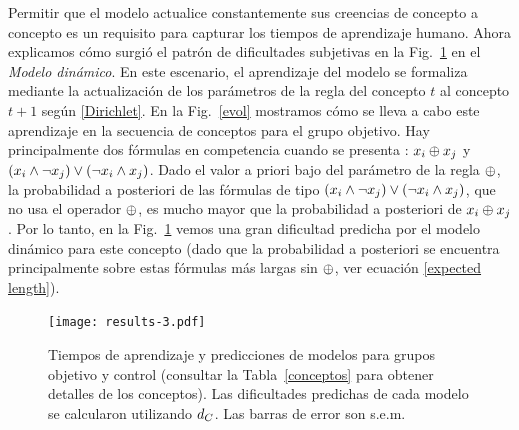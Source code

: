 Permitir que el modelo actualice constantemente sus creencias de concepto a concepto es un requisito para capturar los tiempos de aprendizaje humano. Ahora explicamos cómo surgió el patrón de dificultades subjetivas en la Fig.~\ref{results} en el \textit{Modelo dinámico}. En este escenario, el aprendizaje del modelo se formaliza mediante la actualización de los parámetros de la regla del concepto $ t $ al concepto $ t + 1 $ según \eqref {Dirichlet}. En la Fig.~\ref{evol} mostramos cómo se lleva a cabo este aprendizaje en la secuencia de conceptos para el grupo objetivo. Hay principalmente dos fórmulas en competencia cuando se presenta \targetb: $x_{i} \oplus x_{j}$ y $(x_{i} \wedge \neg x_{j}) \vee (\neg x_{i} \wedge x_{j})$. Dado el valor a priori bajo del parámetro de la regla $ \oplus $, la probabilidad a posteriori de las fórmulas de tipo $ (x_{i} \wedge \neg x_{j}) \vee (\neg x_{i} \wedge x_{j}) $, que no usa el operador $ \oplus $, es mucho mayor que la probabilidad a posteriori de $ x_{i} \oplus x_{j} $. Por lo tanto, en la Fig.~\ref{results} vemos una gran dificultad predicha por el modelo dinámico para este concepto (dado que la probabilidad a posteriori se encuentra principalmente sobre estas fórmulas más largas sin $ \oplus $, ver ecuación \eqref{expected length}).
\begin{figure}
      \centering
      \texttt{[image: results-3.pdf]}
      \caption{
      Tiempos de aprendizaje y predicciones de modelos para grupos objetivo y control (consultar la Tabla~\ref{conceptos} para obtener detalles de los conceptos). Las dificultades predichas de cada modelo se calcularon utilizando $ d_C $. Las barras de error son s.e.m.
      }
      \label{results}
\end{figure}

